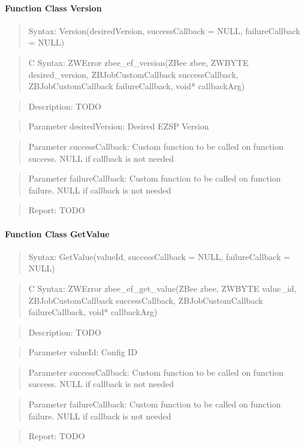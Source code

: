
\paragraph{Function Class Version}
\begin{quote}Syntax: Version(desiredVersion, successCallback = NULL, failureCallback = NULL)\end{quote}
\begin{quote}C Syntax: ZWError zbee\_ef\_version(ZBee zbee, ZWBYTE desired\_version, ZBJobCustomCallback successCallback, ZBJobCustomCallback failureCallback, void* callbackArg)\end{quote}
\begin{quote}Description: TODO\end{quote}
\begin{quote}Parameter desiredVersion: Desired EZSP Version\end{quote}
\begin{quote}Parameter successCallback: Custom function to be called on function success. NULL if callback is not needed\end{quote}
\begin{quote}Parameter failureCallback: Custom function to be called on function failure. NULL if callback is not needed\end{quote}
\begin{quote}Report: TODO\end{quote}

\paragraph{Function Class GetValue}
\begin{quote}Syntax: GetValue(valueId, successCallback = NULL, failureCallback = NULL)\end{quote}
\begin{quote}C Syntax: ZWError zbee\_ef\_get\_value(ZBee zbee, ZWBYTE value\_id, ZBJobCustomCallback successCallback, ZBJobCustomCallback failureCallback, void* callbackArg)\end{quote}
\begin{quote}Description: TODO\end{quote}
\begin{quote}Parameter valueId: Config ID\end{quote}
\begin{quote}Parameter successCallback: Custom function to be called on function success. NULL if callback is not needed\end{quote}
\begin{quote}Parameter failureCallback: Custom function to be called on function failure. NULL if callback is not needed\end{quote}
\begin{quote}Report: TODO\end{quote}

